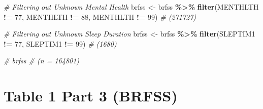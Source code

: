 \documentclass[
]{article}
\newenvironment{Shaded}{\begin{snugshade}}{\end{snugshade}}
\newcommand{\CommentTok}[1]{\textcolor[rgb]{0.56,0.35,0.01}{\textit{#1}}}
\newcommand{\DecValTok}[1]{\textcolor[rgb]{0.00,0.00,0.81}{#1}}
\newcommand{\FunctionTok}[1]{\textcolor[rgb]{0.13,0.29,0.53}{\textbf{#1}}}
\newcommand{\NormalTok}[1]{#1}
\newcommand{\OtherTok}[1]{\textcolor[rgb]{0.56,0.35,0.01}{#1}}
\newcommand{\SpecialCharTok}[1]{\textcolor[rgb]{0.81,0.36,0.00}{\textbf{#1}}}
\begin{document}
\begin{Shaded}
\begin{Highlighting}[]
\CommentTok{\# Filtering out Unknown Mental Health }
\NormalTok{brfss }\OtherTok{\textless{}{-}}\NormalTok{ brfss }\SpecialCharTok{\%\textgreater{}\%} 
  \FunctionTok{filter}\NormalTok{(MENTHLTH }\SpecialCharTok{!=} \DecValTok{77}\NormalTok{, MENTHLTH }\SpecialCharTok{!=} \DecValTok{88}\NormalTok{, MENTHLTH }\SpecialCharTok{!=} \DecValTok{99}\NormalTok{) }\CommentTok{\# (271727)}

\CommentTok{\# Filtering out Unknown Sleep Duration}
\NormalTok{brfss }\OtherTok{\textless{}{-}}\NormalTok{ brfss }\SpecialCharTok{\%\textgreater{}\%} 
  \FunctionTok{filter}\NormalTok{(SLEPTIM1 }\SpecialCharTok{!=} \DecValTok{77}\NormalTok{, SLEPTIM1 }\SpecialCharTok{!=} \DecValTok{99}\NormalTok{) }\CommentTok{\# (1680)}

\CommentTok{\# brfss \# (n = 164801)}
\end{Highlighting}
\end{Shaded}

\section{Table 1 Part 3 (BRFSS)}\label{table-1-part-3-brfss}
\end{document}

